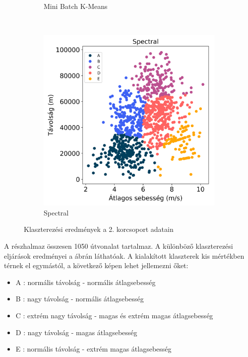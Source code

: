 \begin{figure}[!h]
\begin{subfigure}{.5\linewidth}
		\caption{Mini Batch K-Means}
		\label{subfig:clusteringAgeGroupTwoMiniBatch}
	\end{subfigure}\\[1ex]
	\begin{subfigure}{.5\linewidth}
		\centering
		\includegraphics[width=\textwidth,keepaspectratio]{kepek/clustering/age_group_2_spectral_results.png}
		\caption{Spectral}
		\label{subfig:clusteringAgeGroupTwoSpectral}
	\end{subfigure}
	\caption{Klaszterezési eredmények a 2. korcsoport adatain}
	\label{fig:clusteringAgeGroupTwo}
\end{figure}

A részhalmaz összesen 1050 útvonalat tartalmaz. A különböző klaszterezési eljárások eredményei a  ábrán láthatóak. A kialakított klaszterek kis mértékben térnek el egymástól, a következő képen lehet jellemezni őket:
\begin{itemize}
	\item A : normális távolság - normális átlagsebesség
	\item B : nagy távolság - normális átlagsebesség
	\item C : extrém nagy távolság - magas és extrém magas átlagsebesség
	\item D : nagy távolság - magas átlagsebesség
	\item E : normális távolság -  extrém magas átlagsebesség
\end{itemize}

